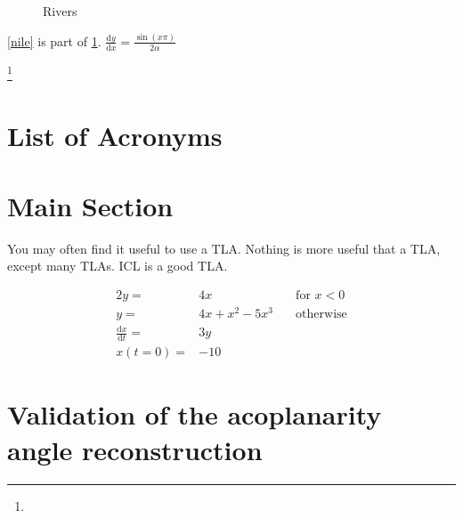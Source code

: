 \documentclass[12pt, a4paper, twoside]{report}
\newcommand{\hardmaths} {\frac{\sin{(x\pi)}} {2\alpha}}
\newcommand{\diff}[2]  {\frac{\textrm{d}{#1}} {\textrm{d}{#2}}}
\begin{document}
\begin{figure}
\caption{Rivers}\label{rivers}
\end{figure}

\ref{nile} is part of \ref{rivers}.
\clearpage
$\diff{y}{x}=\hardmaths$

\clearpage
\blindtext
\begin{singlespace}
\blindtext
\end{singlespace}
\blindtext\footnote{\blindtext}
\clearpage
\section{List of Acronyms}
\begin{acronym}
\end{acronym}

\section{Main Section}
You may often find it useful to use a \ac{TLA}. Nothing is more useful that a \ac{TLA}, except many \acp{TLA}. \ac{ICL} is a good \ac{TLA}.

\begin{alignat}{2}
y=&4x \quad & \textrm{for } x < 0\\
y=&4x+x^{2}-5x^{3} \quad & \textrm{otherwise}\\
\diff{x}{t}=& 3y\\
x(t=0)=&-10
\end{alignat}

\section{Validation of the acoplanarity angle reconstruction}



\end{document}
